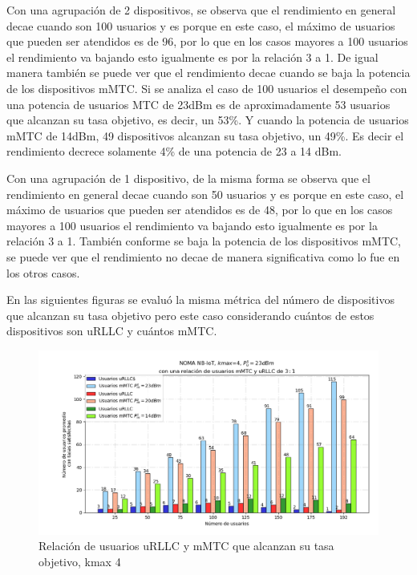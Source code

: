 Con una agrupación de 2 dispositivos, se observa que el rendimiento en general decae cuando son 100 usuarios y es porque en este caso, el máximo de usuarios que pueden ser atendidos es de 96, por lo que en los casos mayores a 100 usuarios el rendimiento va bajando esto igualmente es por la relación 3 a 1. De igual manera también se puede ver que el rendimiento decae cuando se baja la potencia de los dispositivos mMTC. Si se analiza el caso de 100 usuarios el desempeño con una potencia de usuarios MTC de 23dBm es de aproximadamente 53 usuarios que alcanzan su tasa objetivo, es decir, un 53\%. Y cuando la potencia de usuarios mMTC de 14dBm, 49 dispositivos alcanzan su tasa objetivo, un 49\%. Es decir el rendimiento decrece solamente 4\% de una potencia de 23 a 14 dBm.\newline

Con una agrupación de 1 dispositivo, de la misma forma se observa que el rendimiento en general decae cuando son 50 usuarios y es porque en este caso, el máximo de usuarios que pueden ser atendidos es de 48, por lo que en los casos mayores a 100 usuarios el rendimiento va bajando esto igualmente es por la relación 3 a 1. También conforme se baja la potencia de los dispositivos mMTC, se puede ver que el rendimiento no decae de manera significativa como lo fue en los otros casos. \newline

\break

En las siguientes figuras se evaluó la misma métrica del número de dispositivos que alcanzan su tasa objetivo pero este caso considerando cuántos de estos dispositivos son uRLLC y cuántos mMTC.\newline

\begin{figure}[th]
    \centering
    \includegraphics[scale=.65]{Figures/ResultadosNOMA/Kmax4_DiferentesPM.png}
    \decoRule
    \caption[Relación de usuarios uRLLC y mMTC que alcanzan su tasa objetivo, kmax 4]{Relación de usuarios uRLLC y mMTC que alcanzan su tasa objetivo, kmax 4}
    \label{fig:Kmax4_DiferentesPM}
\end{figure}

